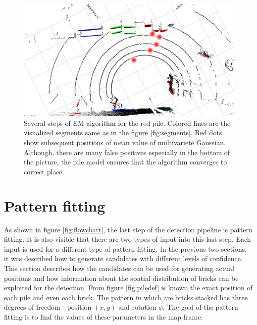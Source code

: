 \begin{figure}[H]
\centering
\includegraphics[scale=0.3]{fig/em_algo.png}
\caption[Em Algorithm in pile detector]{Several steps of EM algorithm for the red pile. Colored lines are the visualized segments same as in the figure \ref{fig:segments}. Red dots show subsequent positions of mean value of multivariete Gaussian. Although, there are many false positives especially in the bottom of the picture, the pile model ensures that the algorithm converges to correct place.}
\label{fig:em}
\end{figure}


\section{Pattern fitting}
As shown in figure \ref{fig:flowchart}, the last step of the detection pipeline is pattern fitting. It is also visible that there are two types of input into this last step. Each input is used for a different type of pattern fitting. In the previous two sections, it was described how to generate candidates with different levels of confidence. This section describes how the candidates can be used for generating actual positions and how information about the spatial distribution of bricks can be exploited for the detection. From figure \ref{fig:piledef} is known the exact position of each pile and even each brick. The pattern in which are bricks stacked has three degrees of freedom - position $(x, y)$ and rotation $\phi$. The goal of the pattern fitting is to find the values of these parameters in the map frame.

